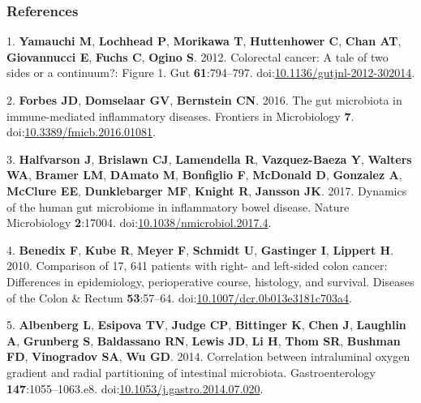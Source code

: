 \documentclass[11pt,]{article}
\begin{document}
\subsubsection*{References}\label{references}

\hypertarget{refs}{}
\hypertarget{ref-Yamauchi2012}{}
1. \textbf{Yamauchi M}, \textbf{Lochhead P}, \textbf{Morikawa T},
\textbf{Huttenhower C}, \textbf{Chan AT}, \textbf{Giovannucci E},
\textbf{Fuchs C}, \textbf{Ogino S}. 2012. Colorectal cancer: A tale of
two sides or a continuum?: Figure 1. Gut \textbf{61}:794--797.
doi:\href{https://doi.org/10.1136/gutjnl-2012-302014}{10.1136/gutjnl-2012-302014}.

\hypertarget{ref-Forbes2016}{}
2. \textbf{Forbes JD}, \textbf{Domselaar GV}, \textbf{Bernstein CN}.
2016. The gut microbiota in immune-mediated inflammatory diseases.
Frontiers in Microbiology \textbf{7}.
doi:\href{https://doi.org/10.3389/fmicb.2016.01081}{10.3389/fmicb.2016.01081}.

\hypertarget{ref-Halfvarson2017}{}
3. \textbf{Halfvarson J}, \textbf{Brislawn CJ}, \textbf{Lamendella R},
\textbf{Vazquez-Baeza Y}, \textbf{Walters WA}, \textbf{Bramer LM},
\textbf{DAmato M}, \textbf{Bonfiglio F}, \textbf{McDonald D},
\textbf{Gonzalez A}, \textbf{McClure EE}, \textbf{Dunklebarger MF},
\textbf{Knight R}, \textbf{Jansson JK}. 2017. Dynamics of the human gut
microbiome in inflammatory bowel disease. Nature Microbiology
\textbf{2}:17004.
doi:\href{https://doi.org/10.1038/nmicrobiol.2017.4}{10.1038/nmicrobiol.2017.4}.

\hypertarget{ref-Benedix2010}{}
4. \textbf{Benedix F}, \textbf{Kube R}, \textbf{Meyer F},
\textbf{Schmidt U}, \textbf{Gastinger I}, \textbf{Lippert H}. 2010.
Comparison of 17, 641 patients with right- and left-sided colon cancer:
Differences in epidemiology, perioperative course, histology, and
survival. Diseases of the Colon \& Rectum \textbf{53}:57--64.
doi:\href{https://doi.org/10.1007/dcr.0b013e3181c703a4}{10.1007/dcr.0b013e3181c703a4}.

\hypertarget{ref-Albenberg2014}{}
5. \textbf{Albenberg L}, \textbf{Esipova TV}, \textbf{Judge CP},
\textbf{Bittinger K}, \textbf{Chen J}, \textbf{Laughlin A},
\textbf{Grunberg S}, \textbf{Baldassano RN}, \textbf{Lewis JD},
\textbf{Li H}, \textbf{Thom SR}, \textbf{Bushman FD}, \textbf{Vinogradov
SA}, \textbf{Wu GD}. 2014. Correlation between intraluminal oxygen
gradient and radial partitioning of intestinal microbiota.
Gastroenterology \textbf{147}:1055--1063.e8.
doi:\href{https://doi.org/10.1053/j.gastro.2014.07.020}{10.1053/j.gastro.2014.07.020}.
\end{document}

